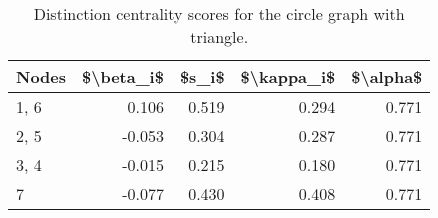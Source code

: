 \begin{table}
\centering
\caption{\label{tab:circletriangle}Distinction centrality scores for the circle graph with triangle.}
\centering
\begin{tabular}[t]{lrrrr}
\toprule
Nodes & \$\textbackslash{}beta\_i\$ & \$s\_i\$ & \$\textbackslash{}kappa\_i\$ & \$\textbackslash{}alpha\$\\
\midrule
1, 6 & 0.106 & 0.519 & 0.294 & 0.771\\
2, 5 & -0.053 & 0.304 & 0.287 & 0.771\\
3, 4 & -0.015 & 0.215 & 0.180 & 0.771\\
7 & -0.077 & 0.430 & 0.408 & 0.771\\
\bottomrule
\end{tabular}
\end{table}
